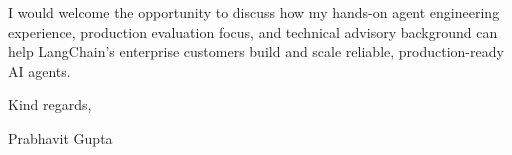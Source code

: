 \documentclass[11pt,a4paper]{article}
\begin{document}
\noindent I would welcome the opportunity to discuss how my hands-on agent engineering experience, production evaluation focus, and technical advisory background can help LangChain's enterprise customers build and scale reliable, production-ready AI agents.

\vspace{8pt}

\noindent Kind regards,

\vspace{6pt}

\noindent Prabhavit Gupta
\end{document}
